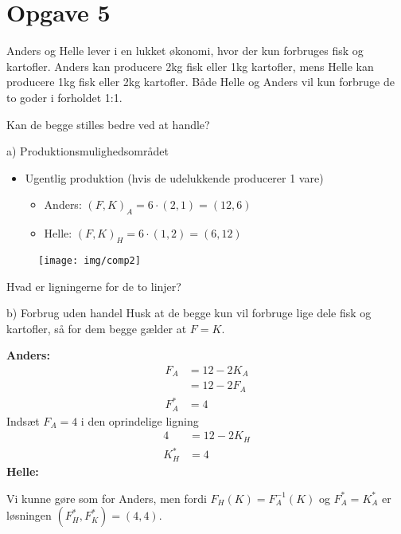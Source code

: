 \section{Opgave 5}

\begin{frame}
Anders og Helle lever i en lukket økonomi, hvor der kun forbruges fisk og kartofler. Anders kan producere 2kg fisk eller 1kg kartofler, mens Helle kan producere 1kg fisk eller 2kg kartofler. Både Helle og Anders vil kun forbruge de to goder i forholdet 1:1.

Kan de begge stilles bedre ved at handle?
\end{frame}

\begin{frame}{a) Produktionsmulighedsområdet}
\begin{itemize}
  \item Ugentlig produktion (hvis de udelukkende producerer 1 vare)
  \begin{itemize}
    \item Anders: $(F,K)_A = 6\cdot (2,1) = (12,6)$
    \item Helle: $(F,K)_H = 6 \cdot (1,2) = (6, 12)$
  \end{itemize}
\end{itemize}
\begin{figure}
\centering
    \texttt{[image: img/comp2]}
\end{figure}
Hvad er ligningerne for de to linjer?
\end{frame}


\begin{frame}{b) Forbrug uden handel}
Husk at de begge kun vil forbruge lige dele fisk og kartofler, så for dem begge gælder at $F=K$.

\textbf{Anders:}
\begin{align*}
  F_A &= 12-2K_A \\
  & = 12 - 2F_A \\
  F^*_A &= 4
\end{align*}
Indsæt $F_A = 4$ i den oprindelige ligning
\begin{align*}
  4 &= 12 -2K_H \\
  K^*_H &= 4
\end{align*}
\textbf{Helle:}

Vi kunne gøre som for Anders, men fordi $F_H(K) = F_A^{-1}(K)$ og $F_A^*=K_A^*$ er løsningen $(F_H^*, F_K^*) = (4,4)$.
\end{frame}


